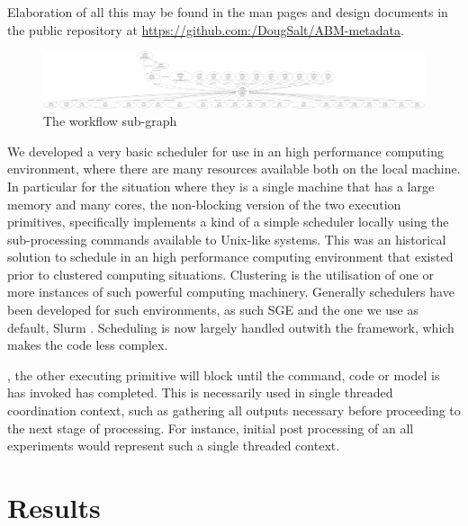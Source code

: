 \documentclass[runningheads]{llncs}
\newcommand*\ttvar[1]{\texttt{\expandafter\dottvar\detokenize{#1}\relax}}
\newcommand*\dottvar[1]{\ifx\relax#1\else
  \expandafter\ifx\string_#1\string_\allowbreak\else#1\fi
  \expandafter\dottvar\fi}
\begin{document}
Elaboration of all this may be found in the man pages and design documents in
the public repository at \url{https://github.com:/DougSalt/ABM-metadata}.

\begin{figure} \includegraphics[width=\textwidth]{img/workflow.pdf}
\caption{The workflow sub-graph} \label{fig:workflow} \end{figure}

We developed a very basic scheduler for use in an high performance computing
environment, where there are many resources available both on the local
machine. In particular for the situation where they is a single machine that
has a large memory and many cores, the non-blocking version of the  two
execution primitives, specifically {\color{blue} \ttvar{SSREPI_batch}}
implements a kind of a simple scheduler locally using the sub-processing
commands available to Unix-like systems. This was an historical solution to
schedule in an high performance computing environment that existed prior to
clustered computing situations. Clustering is the utilisation of one or more
instances of such powerful computing machinery. Generally schedulers have been
developed for such environments, as such SGE \cite{gentzsch2001sun} and the one
we use as default, Slurm \cite{yoo2003slurm}. Scheduling is now largely handled
outwith the framework, which makes the code less complex.

{\color{blue} \ttvar{SSREPI_run}}, the other executing primitive will block
until the command, code or model is has invoked has completed. This is
necessarily used in single threaded coordination context, such as gathering all
outputs necessary before proceeding to the next stage of processing. For
instance, initial post processing of an all experiments would represent such a
single threaded context.

\section{Results}
\end{document}
